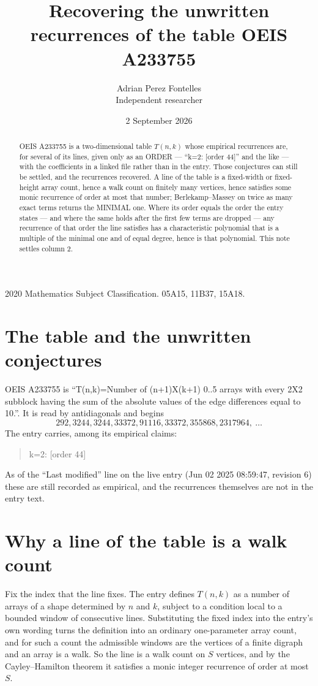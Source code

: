 \documentclass[11pt,a4paper]{article}
\title{Recovering the unwritten recurrences of the table OEIS A233755}
\author{Adrian Perez Fontelles\\ \small Independent researcher}
\date{2 September 2026}
\theoremstyle{plain}
\theoremstyle{definition}
\begin{document}
\maketitle

\begin{abstract}
OEIS A233755 is a two-dimensional table $T(n,k)$ whose empirical recurrences are, for several of
its lines, given only as an ORDER --- ``k=2: [order 44]'' and the like --- with the
coefficients in a linked file rather than in the entry. Those conjectures can still be settled,
and the recurrences recovered. A line of the table is a fixed-width or fixed-height array
count, hence a walk count on finitely many vertices, hence satisfies some monic recurrence of
order at most that number; Berlekamp--Massey on twice as many exact terms returns the MINIMAL
one. Where its order equals the order the entry states --- and where the same holds after the
first few terms are dropped --- any recurrence of that order the line satisfies has a
characteristic polynomial that is a multiple of the minimal one and of equal degree, hence is
that polynomial. This note settles column 2.
\end{abstract}

\noindent\small 2020 Mathematics Subject Classification. 05A15, 11B37, 15A18.\normalsize

\section{The table and the unwritten conjectures}

OEIS A233755 is ``T(n,k)=Number of (n+1)X(k+1) 0..5 arrays with every 2X2 subblock having the sum of the absolute values of the edge differences equal to 10.''. It is read by antidiagonals and begins
\[
292, 3244, 3244, 33372, 91116, 33372, 355868, 2317964,\ \dots
\]
The entry carries, among its empirical claims:
\begin{quote}\small
k=2: [order 44]
\end{quote}
As of the ``Last modified'' line on the live entry (Jun 02 2025 08:59:47, revision 6) these are still
recorded as empirical, and the recurrences themselves are not in the entry text.

\section{Why a line of the table is a walk count}

Fix the index that the line fixes. The entry defines $T(n,k)$ as a number of arrays of a shape
determined by $n$ and $k$, subject to a condition local to a bounded window of consecutive
lines. Substituting the fixed index into the entry's own wording turns the definition into an
ordinary one-parameter array count, and for such a count the admissible windows are the
vertices of a finite digraph and an array is a walk. So the line is a walk count on $S$
vertices, and by the Cayley--Hamilton theorem it satisfies a monic integer recurrence of order
at most $S$.
\end{document}
